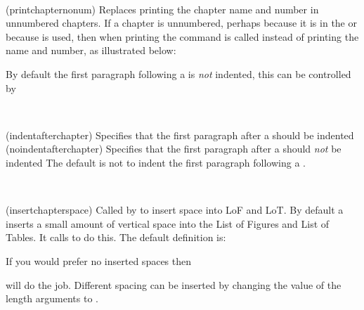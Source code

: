 \begin{syntax}
\cmd{\printchapternonum} \\
\end{syntax}
\glossary(printchapternonum)%
  {}%
  {Replaces printing the chapter name and number in unnumbered chapters.}
If a chapter is unnumbered, perhaps because it is in the \cmd{\frontmatter}
or because \cmd{\chapter*} is used, then when printing the command
\cmd{\printchapternonum} is called instead of printing the name and number,
as illustrated below:
\begin{lcode}
\newcommand{\chapterhead}[1]{ %
  \clearforchapter        %
  \thispagestyle{chapter} %
  \insertchapterspace     %
  \chapterheadstart       %
  \printchaptername\chapternamenum\printchapternum
  \afterchapternum        %
  \printchaptertitle{#1}  %
  \afterchaptertitle}     %
\end{lcode}
%
%
%
By default the first paragraph following a  is \emph{not}
indented, this can be controlled by
\begin{syntax}
  \cmd{\indentafterchapter}\\
  \cmd{\noindentafterchapter}
\end{syntax}
\glossary(indentafterchapter)%
{}%
{Specifies that the first paragraph after a  should be indented}
\glossary(noindentafterchapter)%
{}%
{Specifies that the first paragraph after a  should \emph{not} be indented}
The default is not to indent the first paragraph following a
.

\begin{syntax}
\cmd{\insertchapterspace} \\
\end{syntax}
\glossary(insertchapterspace)%
  {}%
  {Called by  to insert space into LoF and LoT.}
By default a \cmd{\chapter} inserts a small amount of vertical space
into the List of Figures and List of Tables. It calls \cmd{\insertchapterspace}
to do this. The default definition is:
\begin{lcode}
\newcommand{\insertchapterspace}{%
  \addtocontents{lof}{\protect\addvspace{10pt}}%
  \addtocontents{lot}{\protect\addvspace{10pt}}%
}
\end{lcode}
If you would prefer no inserted spaces then
\begin{lcode}
\renewcommand{\insertchapterspace}{}
\end{lcode}
will do the job.
Different spacing can be inserted by
changing the value of the length arguments to \cmd{\addvspace}.

